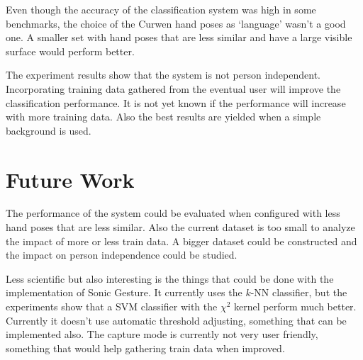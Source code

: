 Even though the accuracy of the classification system was high in some benchmarks, the choice of the Curwen hand poses as `language' wasn't a good one. A smaller set with hand poses that are less similar and have a large visible surface would perform better.

The experiment results show that the system is not person independent. Incorporating training data gathered from the eventual user will improve the classification performance. It is not yet known if the performance will increase with more training data. Also the best results are yielded when a simple background is used.

\section{Future Work}
The performance of the system could be evaluated when configured with less hand poses that are less similar. Also the current dataset is too small to analyze the impact of more or less train data. A bigger dataset could be constructed and the impact on person independence could be studied.

Less scientific but also interesting is the things that could be done with the implementation of Sonic Gesture. It currently uses the $k$-NN classifier, but the experiments show that a SVM classifier with the $\chi^2$ kernel perform much better. Currently it doesn't use automatic threshold adjusting, something that can be implemented also. The capture mode is currently not very user friendly, something that would help gathering train data when improved. 